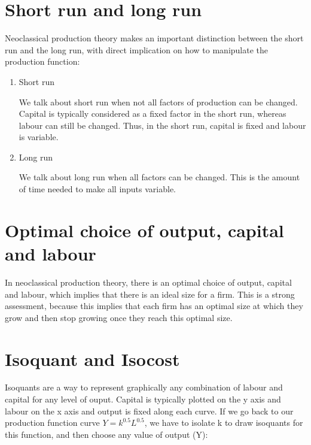 \documentclass[
  letterpaper,
  DIV=11,
  numbers=noendperiod]{scrreprt}
\begin{document}
\hypertarget{short-run-and-long-run}{%
\section{Short run and long run}\label{short-run-and-long-run}}

Neoclassical production theory makes an important distinction between
the short run and the long run, with direct implication on how to
manipulate the production function:

\begin{enumerate}
\def\labelenumi{\arabic{enumi}.}
\item
  Short run

  We talk about short run when not all factors of production can be
  changed. Capital is typically considered as a fixed factor in the
  short run, whereas labour can still be changed. Thus, in the short
  run, capital is fixed and labour is variable.
\item
  Long run

  We talk about long run when all factors can be changed. This is the
  amount of time needed to make all inputs variable.
\end{enumerate}

\hypertarget{optimal-choice-of-output-capital-and-labour}{%
\section{Optimal choice of output, capital and
labour}\label{optimal-choice-of-output-capital-and-labour}}

In neoclassical production theory, there is an optimal choice of output,
capital and labour, which implies that there is an ideal size for a
firm. This is a strong assessment, because this implies that each firm
has an optimal size at which they grow and then stop growing once they
reach this optimal size.

\hypertarget{isoquant-and-isocost}{%
\section{Isoquant and Isocost}\label{isoquant-and-isocost}}

Isoquants are a way to represent graphically any combination of labour
and capital for any level of ouput. Capital is typically plotted on the
y axis and labour on the x axis and output is fixed along each curve. If
we go back to our production function curve \(Y = k^{0.5}L^{0.5}\), we
have to isolate k to draw isoquants for this function, and then choose
any value of output (Y):
\end{document}
